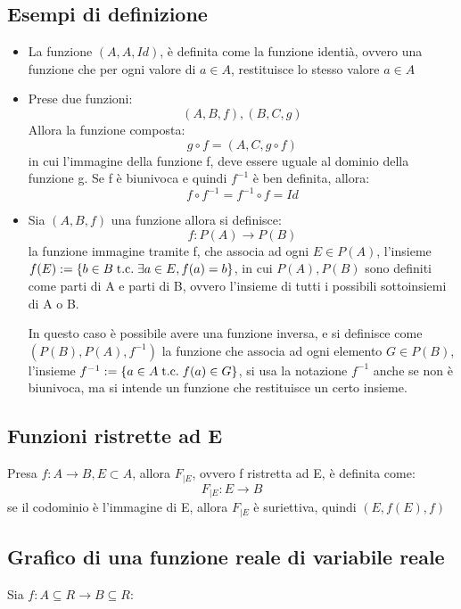 \documentclass[a4paper,12pt]{article}
\begin{document}
	 \subsection{Esempi di definizione}
	 \begin{itemize}
	 	\item La funzione $(A, A, Id)$, è definita come la funzione identià, ovvero una funzione che per ogni valore di $a \in A$, restituisce lo stesso valore $a \in A$
	 	\item Prese due funzioni:
	 	\[(A, B, f), (B, C, g)\]
	 	Allora la funzione composta:
	 	\[g \circ f = (A, C, g \circ f)\]
	 	in cui l'immagine della funzione f, deve essere uguale al dominio della funzione g.
	 	Se f è biunivoca e quindi $f^{-1}$ è ben definita, allora:
	 	\[f \circ f^{-1} = f^{-1} \circ f = Id\]
	 	\item Sia $(A, B, f)$ una funzione allora si definisce:
	 	\[f: P(A) \longrightarrow P(B)\]
	 	la funzione immagine tramite f, che associa ad ogni $E \in P(A)$, l'insieme $f(E) := \{b \in B \;\text{t.c.}\; \exists a \in E, f(a) = b\}$, in cui $P(A), P(B)$ sono definiti come parti di A e parti di B, ovvero l'insieme di tutti i possibili sottoinsiemi di A o B.
	 	
	 	In questo caso è possibile avere una funzione inversa, e si definisce come $(P(B), P(A), f^{-1})$ la funzione che associa ad ogni elemento $G \in P(B)$, l'insieme $f^{-1} := \{a \in A \;\text{t.c.}\; f(a) \in G\}$, si usa la notazione $f^{-1}$ anche se non è biunivoca, ma si intende un funzione che restituisce un certo insieme.
	 \end{itemize}
	 
	 \subsection{Funzioni ristrette ad E}
	 Presa $f : A \longrightarrow B, E \subset A$, allora $F_{|E}$, ovvero f ristretta ad E, è definita come:
	 \[F_{|E} : E \longrightarrow B\]
	 se il codominio è l'immagine di E, allora $F_{|E}$ è 
	 suriettiva, quindi $(E, f(E), f)$
	 \subsection{Grafico di una funzione reale di variabile reale}
	 Sia $f: A \subseteq R \longrightarrow B \subseteq R$:
	 
\end{document}
